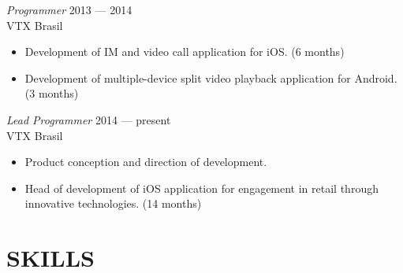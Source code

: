 \documentclass[]{res} %
\newcommand{\sbt}{\,\begin{picture}(-1,1)(-2,-3)\circle*{2}\end{picture}\ }
\def \divspace{6pt}
\def \myitemback{0.55cm}
\def \myitemsep{0pt}
\def \mypositionface{\sl}
\def \myorgface{\sc}
\begin{document}
\begin{resume}
{\mypositionface Programmer} \hfill 2013 — 2014 \\
{\myorgface VTX Brasil}

\begin{itemize}[itemsep=\myitemsep,leftmargin=\myitemback]
\item[\sbt] Development of IM and video call application for iOS. (6 months)
\item[\sbt] Development of multiple-device split video playback application for Android. (3 months)
\end{itemize}

{\mypositionface Lead Programmer} \hfill 2014 — present \\
{\myorgface VTX Brasil}

\begin{itemize}[itemsep=\myitemsep,leftmargin=\myitemback]
\item[\sbt] Product conception and direction of development.
\item[\sbt] Head of development of iOS application for engagement in retail through innovative technologies. (14 months)
\end{itemize}

\section{SKILLS \hspace{\divspace} }


\end{resume}
\end{document}
